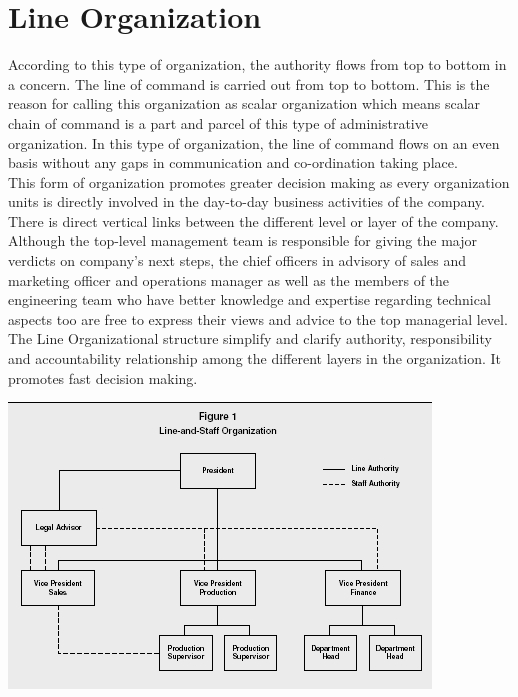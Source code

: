 \documentclass[12pt,a4paper]{scrreprt}
\begin{document}
\section{Line Organization}
    According to this type of organization, the authority flows from top to bottom in a concern. The line of command is carried out from top to bottom. This is the reason for calling this organization as scalar organization which means scalar chain of command is a part and parcel of this type of administrative organization. In this type of organization, the line of command flows on an even basis without any gaps in communication and co-ordination taking place. \\
    This form of organization promotes greater decision making as every organization units is directly involved in the day-to-day business activities of the company. There is direct vertical links between the different level or layer of the company. Although the top-level management team is responsible for giving the major verdicts on company’s next steps, the chief officers in advisory of sales and marketing officer and operations manager as well as the members of the engineering team who have better knowledge and expertise regarding technical aspects too are free to express their views and advice to the top managerial level. The Line Organizational structure simplify and clarify authority, responsibility and accountability relationship among the different layers in the organization. It promotes fast decision making.

    \begin{center}
        \includegraphics{line-org.jpg}
    \end{center}
\end{document}
